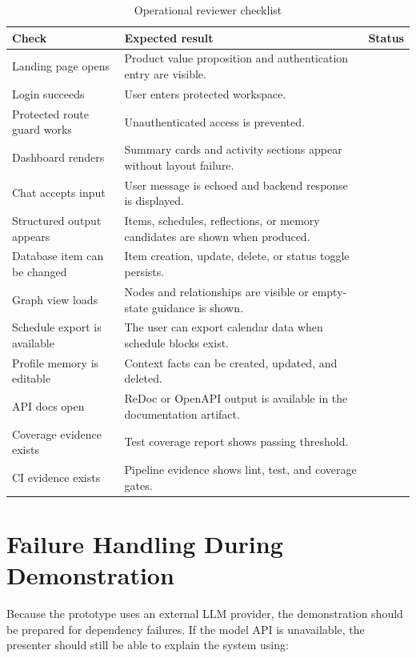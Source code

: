 \begin{longtable}{|p{}|p{}|p{}|}
\caption{Operational reviewer checklist}
\label{tab:reviewer-checklist}\\
\hline
\textbf{Check} & \textbf{Expected result} & \textbf{Status}\\
\hline
Landing page opens & Product value proposition and authentication entry are visible. & \\
\hline
Login succeeds & User enters protected workspace. & \\
\hline
Protected route guard works & Unauthenticated access is prevented. & \\
\hline
Dashboard renders & Summary cards and activity sections appear without layout failure. & \\
\hline
Chat accepts input & User message is echoed and backend response is displayed. & \\
\hline
Structured output appears & Items, schedules, reflections, or memory candidates are shown when produced. & \\
\hline
Database item can be changed & Item creation, update, delete, or status toggle persists. & \\
\hline
Graph view loads & Nodes and relationships are visible or empty-state guidance is shown. & \\
\hline
Schedule export is available & The user can export calendar data when schedule blocks exist. & \\
\hline
Profile memory is editable & Context facts can be created, updated, and deleted. & \\
\hline
API docs open & ReDoc or OpenAPI output is available in the documentation artifact. & \\
\hline
Coverage evidence exists & Test coverage report shows passing threshold. & \\
\hline
CI evidence exists & Pipeline evidence shows lint, test, and coverage gates. & \\
\hline
\end{longtable}

\section{Failure Handling During Demonstration}

Because the prototype uses an external LLM provider, the demonstration should be prepared for dependency failures. If the model API is unavailable, the presenter should still be able to explain the system using:

